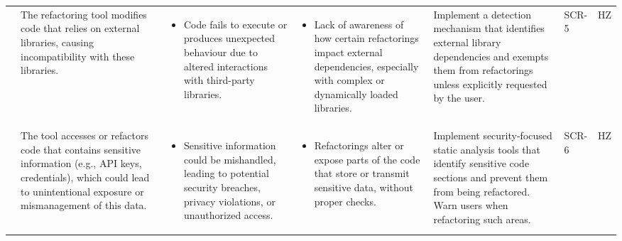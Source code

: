 \documentclass{article}
\newcounter{hazard}
\newcommand{\showmycounter}{\stepcounter{hazard}\thehazard}
\begin{document}
\begin{landscape}
\begin{longtable}{|p{0.6cm}|p{4cm}p{4cm}p{4cm}p{4cm}p{1.5cm}p{1.5cm}|}
    & The refactoring tool modifies code that relies on external libraries, causing incompatibility with these libraries. & 
    \begin{itemize}[wide=0pt]
        \item Code fails to execute or produces unexpected behaviour due to altered interactions with third-party libraries.
    \end{itemize} &
    \begin{itemize}[wide=0pt]
        \item Lack of awareness of how certain refactorings impact external dependencies, especially with complex or dynamically loaded libraries.
    \end{itemize}
    & Implement a detection mechanism that identifies external library dependencies and exempts them from refactorings unless explicitly requested by the user. & SCR-5 & HZ \showmycounter \\ \cline{2-7}

    & The tool accesses or refactors code that contains sensitive information (e.g., API keys, credentials), which could lead to unintentional exposure or mismanagement of this data. & 
    \begin{itemize}[wide=0pt]
        \item Sensitive information could be mishandled, leading to potential security breaches, privacy violations, or unauthorized access.
    \end{itemize} &
    \begin{itemize}[wide=0pt]
        \item Refactorings alter or expose parts of the code that store or transmit sensitive data, without proper checks.
    \end{itemize}
    & Implement security-focused static analysis tools that identify sensitive code sections and prevent them from being refactored. Warn users when refactoring such areas. & SCR-6 & HZ \showmycounter \\ \hline 
    

\end{longtable}
\end{landscape}
\end{document}
